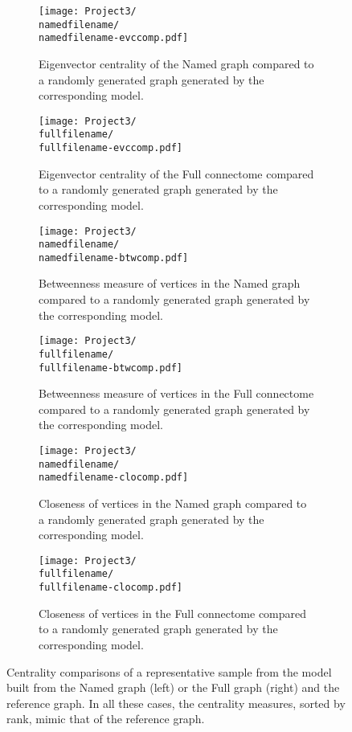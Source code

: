 \documentclass[11]{article}
\newcommand{\namedfilename}{namedminus2-2p}
\newcommand{\fullfilename}{fullminus1-2p}
\theoremstyle{remark}
\theoremstyle{definition}
\begin{document}
\begin{figure}[h!]
  \centering
    \begin{subfigure}[t]{0.4\linewidth}
    \texttt{[image: Project3/\\namedfilename/\\namedfilename-evccomp.pdf]}
    \caption{Eigenvector centrality of the Named graph compared to a randomly generated graph generated by the corresponding model.} 
    \end{subfigure} \hfill
    \begin{subfigure}[t]{0.4\linewidth}
    \texttt{[image: Project3/\\fullfilename/\\fullfilename-evccomp.pdf]}
    \caption{Eigenvector centrality of the Full connectome compared to a randomly generated graph generated by the corresponding model.}
    \end{subfigure} \hfill
    \begin{subfigure}[t]{0.4\linewidth}
    \texttt{[image: Project3/\\namedfilename/\\namedfilename-btwcomp.pdf]}
    \caption{Betweenness measure of vertices in the Named graph compared to a randomly generated graph generated by the corresponding model.} 
    \end{subfigure} \hfill
    \begin{subfigure}[t]{0.4\linewidth}
    \texttt{[image: Project3/\\fullfilename/\\fullfilename-btwcomp.pdf]}
    \caption{Betweenness measure of vertices in the Full connectome compared to a randomly generated graph generated by the corresponding model.}
    \end{subfigure} \hfill
    \begin{subfigure}[t]{0.4\linewidth}
    \texttt{[image: Project3/\\namedfilename/\\namedfilename-clocomp.pdf]}
    \caption{Closeness of vertices in the Named graph compared to a randomly generated graph generated by the corresponding model.} 
    \end{subfigure} \hfill
    \begin{subfigure}[t]{0.4\linewidth}
    \texttt{[image: Project3/\\fullfilename/\\fullfilename-clocomp.pdf]}
    \caption{Closeness of vertices in the Full connectome compared to a randomly generated graph generated by the corresponding model.}
    \end{subfigure} \hfill
  \caption{Centrality comparisons of a representative sample from the model built from the Named graph (left) or the Full graph (right) and the reference graph. In all these cases, the centrality measures, sorted by rank, mimic that of the reference graph.}
  \label{fig:centrality}
\end{figure}
\end{document}
